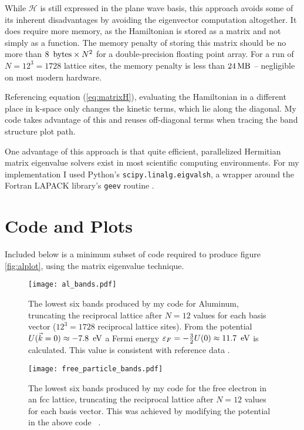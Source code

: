 \documentclass[12pt]{article}
\begin{document}
While $\mathcal{H}$ is still expressed in the plane wave basis, this approach avoids some of its inherent disadvantages by avoiding the eigenvector computation altogether. It does require more memory, as the Hamiltonian is stored as a matrix and not simply as a function. The memory penalty of storing this matrix should be no more than $8 \textrm{\, bytes} \times N^2$ for a double-precision floating point array. For a run of $N = 12^3 = 1728$ lattice sites, the memory penalty is less than $24 \textrm{\,MB}$ -- negligible on most modern hardware.
\par Referencing equation (\ref{eq:matrixH}), evaluating the Hamiltonian in a different place in k-space only changes the kinetic terms, which lie along the diagonal. My code takes advantage of this and reuses off-diagonal terms when tracing the band structure plot path. 
\par One advantage of this approach is that quite efficient, parallelized Hermitian matrix eigenvalue solvers exist in most scientific computing environments. For my implementation I used Python's \texttt{scipy.linalg.eigvalsh}, a wrapper around the Fortran LAPACK library's \texttt{geev} routine \cite{numpyref}.
\section{Code and Plots}
\par Included below is a minimum subset of code required to produce figure \ref{fig:alplot}, using the matrix eigenvalue technique.
\singlespacing
\begin{adjustwidth}{-2em}{0em}

\end{adjustwidth}
\doublespacing
\begin{figure}[!ht]
\centering
\texttt{[image: al\_bands.pdf]}
\caption{The lowest six bands produced by my code for Aluminum, truncating the reciprocal lattice after $N=12$ values for each basis vector ($12^3 = 1728$ reciprocal lattice sites). From the potential $U(\vec{k}=0) \approx -7.8 \textrm{\, eV}$ a Fermi energy $\varepsilon_F = -\frac{3}{2} U(0) \approx 11.7 \textrm{\, eV}$ is calculated. This value is consistent with reference data \cite{Ashcroft76}.}
\label{fig:alplot}
\texttt{[image: free\_particle\_bands.pdf]}
\caption{The lowest six bands produced by my code for the free electron in an fcc lattice, truncating the reciprocal lattice after $N=12$ values for each basis vector. This was achieved by modifying the potential in the above code \texttt{\color{blue}{def} \color{black}{U(K):} \color{blue}{return} \color{black}{0}}.}
\label{fig:fpplot}
\end{figure}
\clearpage


\end{document}
